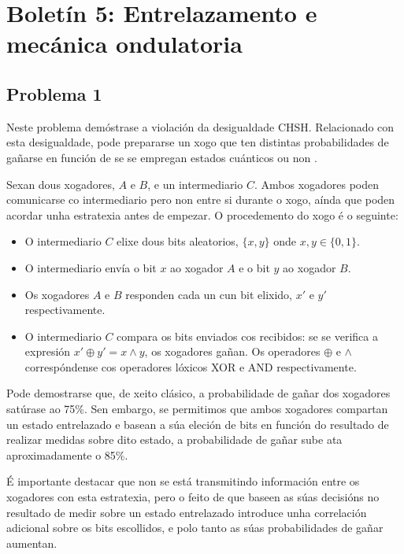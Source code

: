 \documentclass[a4paper,12pt]{article}
\begin{document}
\newpage
\section*{Boletín 5: Entrelazamento e mecánica ondulatoria}

\subsection*{Problema 1}

Neste problema demóstrase a violación da desigualdade CHSH. Relacionado con esta desigualdade, pode prepararse un xogo que ten distintas probabilidades de gañarse en función de se se empregan estados cuánticos ou non \cite{CHSH_game}.

Sexan dous xogadores, $A$ e $B$, e un intermediario $C$. Ambos xogadores poden comunicarse co intermediario pero non entre si durante o xogo, aínda que poden acordar unha estratexia antes de empezar. O procedemento do xogo é o seguinte:
\begin{itemize}
	\item[1)] O intermediario $C$ elixe dous bits aleatorios, $\{x,y\}$ onde $x,y \in \{0,1\}$.

	\item[2)] O intermediario envía o bit $x$ ao xogador $A$ e o bit $y$ ao xogador $B$.

	\item[3)] Os xogadores $A$ e $B$ responden cada un cun bit elixido, $x'$ e $y'$ respectivamente.

	\item[4)] O intermediario $C$ compara os bits enviados cos recibidos: se se verifica a expresión $x' \oplus y' = x \wedge y$, os xogadores gañan. Os operadores $\oplus$ e $\wedge$ correspóndense cos operadores lóxicos XOR e AND respectivamente.
\end{itemize}

\noindent
Pode demostrarse que, de xeito clásico, a probabilidade de gañar dos xogadores satúrase ao 75\%. Sen embargo, se permitimos que ambos xogadores compartan un estado entrelazado e basean a súa eleción de bits en función do resultado de realizar medidas sobre dito estado, a probabilidade de gañar sube ata aproximadamente o 85\%.

É importante destacar que non se está transmitindo información entre os xogadores con esta estratexia, pero o feito de que baseen as súas decisións no resultado de medir sobre un estado entrelazado introduce unha correlación adicional sobre os bits escollidos, e polo tanto as súas probabilidades de gañar aumentan.
\end{document}
